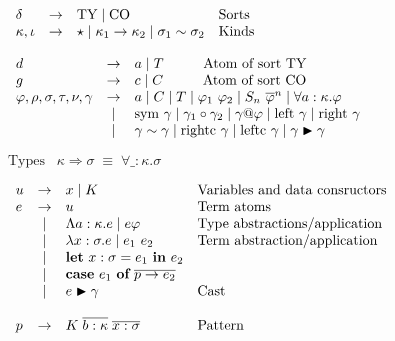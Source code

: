 {\begin{figure}[H]
$
\begin{array}{lcll}
  \delta & \to & \textrm{TY} \;|\; \textrm{CO} & \textrm{Sorts} \\
  \kappa, \iota & \to & 
    \star \;|\; \kappa_1 \to \kappa_2 \;|\; \sigma_1 \sim \sigma_2 & \textrm{Kinds}
\end{array}
$

\vspace{5mm}
\vspace{2mm}

$
\begin{array}{lcl}
  d & \to & a \alt T  \hspace{10mm} \textrm{Atom of sort TY}\\
  g & \to & c \alt C  \hspace{10mm}  \textrm{Atom of sort CO}\\
\varphi, \rho, \sigma, \tau, \nu, \gamma &
  \to & a \alt C \alt T \alt \varphi_1 ~ \varphi_2 \alt S_n ~
  \overline{\varphi}^n \alt \forall a:\kappa.\varphi \\
  & \alt & \textrm{sym} ~ \gamma \alt \gamma_1 \circ \gamma_2 \alt
  \gamma@\varphi \alt \textrm{left} ~ \gamma \alt \textrm{right} ~ \gamma \\
  & \alt & \gamma \sim \gamma \alt \textrm{rightc} ~ \gamma \alt
  \textrm{leftc} ~ \gamma \alt \gamma \blacktriangleright \gamma
\end{array}
$

\vspace{5mm}
\vspace{2mm}

$
\textrm{Types} \;\;\; \kappa \Rightarrow \sigma \; \equiv \; \forall \_ :\kappa. \sigma
$

\vspace{5mm}
\vspace{2mm}

$
\begin{array}{lcll}
  u & \to & x \;|\; K & \textrm{Variables and data consructors} \\
  e & \to & u & \textrm{Term atoms} \\
    & \;|\; & \Lambda a:\kappa.e \;|\; e \varphi & \textrm{Type abstractions/application} \\
    & \;|\; & \lambda x : \sigma.e \;|\; e_1 ~ e_2 & \textrm{Term abstraction/application} \\
    & \;|\; & \mbox{\bf{let}}~x:\sigma=e_1~\mbox{\bf{in}}~e_2 \\
    & \;|\; & \mbox{\bf{case}}~e_1~\mbox{\bf{of}}~\overline{p \to e_2} \\
    & \;|\; & e \blacktriangleright \gamma & \textrm{Cast}\\
    \\
p & \to & K \; \overline{b:\kappa} \; \overline{x:\sigma} & \textrm{Pattern}
\end{array}
$


\end{figure}}
